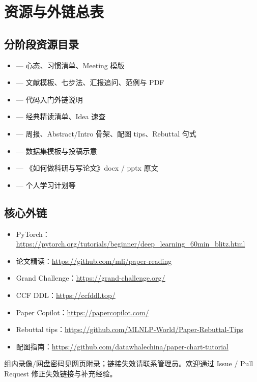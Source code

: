 ﻿\section{资源与外链总表}
\label{sec:appendix}


\subsection{分阶段资源目录}
\begin{itemize}
  \item {} --- 心态、习惯清单、Meeting 模版
  \item {} --- 文献模板、七步法、汇报追问、范例与 PDF
  \item {} --- 代码入门外链说明
  \item {} --- 经典精读清单、Idea 速查
  \item {} --- 周报、Abstract/Intro 骨架、配图 tips、Rebuttal 句式
  \item {} --- 数据集模板与投稿示意
  \item {} --- 《如何做科研与写论文》docx / pptx 原文
  \item {} --- 个人学习计划等
\end{itemize}

\subsection{核心外链}
\begin{itemize}
  \item PyTorch：\url{https://pytorch.org/tutorials/beginner/deep_learning_60min_blitz.html}
  \item 论文精读：\url{https://github.com/mli/paper-reading}
  \item Grand Challenge：\url{https://grand-challenge.org/}
  \item CCF DDL：\url{https://ccfddl.top/}
  \item Paper Copilot：\url{https://papercopilot.com/}
  \item Rebuttal tips：\url{https://github.com/MLNLP-World/Paper-Rebuttal-Tips}
  \item 配图指南：\url{https://github.com/datawhalechina/paper-chart-tutorial}
\end{itemize}

组内录像/网盘密码见网页附录；链接失效请联系管理员。欢迎通过 Issue / Pull Request 修正失效链接与补充经验。
